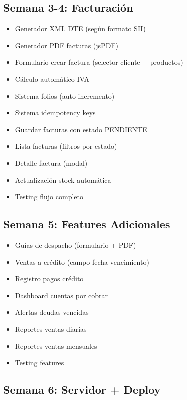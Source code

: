 \documentclass[11pt,a4paper]{article}
\begin{document}
\subsection{Semana 3-4: Facturación}

\begin{itemize}
    \item[$\square$] Generador XML DTE (según formato SII)
    \item[$\square$] Generador PDF facturas (jsPDF)
    \item[$\square$] Formulario crear factura (selector cliente + productos)
    \item[$\square$] Cálculo automático IVA
    \item[$\square$] Sistema folios (auto-incremento)
    \item[$\square$] Sistema idempotency keys
    \item[$\square$] Guardar facturas con estado PENDIENTE
    \item[$\square$] Lista facturas (filtros por estado)
    \item[$\square$] Detalle factura (modal)
    \item[$\square$] Actualización stock automática
    \item[$\square$] Testing flujo completo
\end{itemize}

\subsection{Semana 5: Features Adicionales}

\begin{itemize}
    \item[$\square$] Guías de despacho (formulario + PDF)
    \item[$\square$] Ventas a crédito (campo fecha vencimiento)
    \item[$\square$] Registro pagos crédito
    \item[$\square$] Dashboard cuentas por cobrar
    \item[$\square$] Alertas deudas vencidas
    \item[$\square$] Reportes ventas diarias
    \item[$\square$] Reportes ventas mensuales
    \item[$\square$] Testing features
\end{itemize}

\subsection{Semana 6: Servidor + Deploy}
\end{document}
